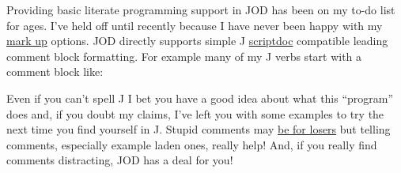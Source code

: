 Providing basic literate programming support in JOD has been on my to-do
list for ages. I've held off until recently because I have never been
happy with my \href{http://en.wikipedia.org/wiki/Markup\_language}{mark
up} options. JOD directly supports simple J
\href{http://www.jsoftware.com/help/user/scriptdoc.htm}{scriptdoc}
compatible leading comment block formatting. For example many of my J
verbs start with a comment block like:

\small
\begin{Shaded}
\begin{Highlighting}[]
\AlertTok{=:}\OtherTok{:} 


 
 \RegionMarkerTok{((}\FunctionTok{-#}\RegionMarkerTok{)} \RegionMarkerTok{(}\RegionMarkerTok{)}  \RegionMarkerTok{)}   
 \FunctionTok{~:}\OtherTok{/\textbackslash{}} 
\RegionMarkerTok{(}\FunctionTok{#}\RegionMarkerTok{)} \FunctionTok{<}\FunctionTok{#}
\RegionMarkerTok{)}
\end{Highlighting}
\end{Shaded}
\normalsize

Even if you can't spell J I bet you have a good idea about what this
``program'' does and, if you doubt my claims, I've left you with some
examples to try the next time you find yourself in J. Stupid comments
may \href{http://php.dzone.com/news/comments-are-losers-2}{be for
losers} but telling comments, especially example laden ones, really
help! And, if you really find comments distracting, JOD has a deal for
you!

